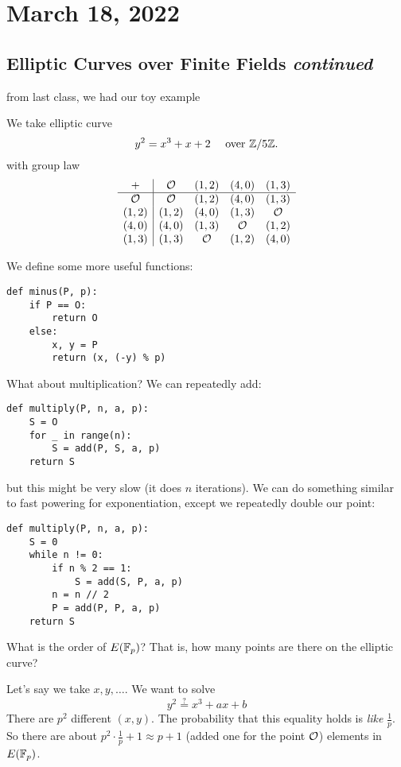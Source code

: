 \section{March 18, 2022}
\subsection{Elliptic Curves over Finite Fields \emph{continued}}
\recall from last class, we had our toy example
\begin{example*}
    We take elliptic curve
    \[y^2 = x^3 + x + 2\quad \text{ over }\mathbb Z/5\mathbb Z.\]
    with group law
    \[\begin{array}{c|cccc}
            +     & \mathcal{O}   & (1,2) & (4,0) & (1,3) \\ \hline
            \mathcal{O}   & \mathcal{O}   & (1,2) & (4,0) & (1,3) \\
            (1,2) & (1,2) & (4,0) & (1,3) & \mathcal{O}   \\
            (4,0) & (4,0) & (1,3) & \mathcal{O}   & (1,2) \\
            (1,3) & (1,3) & \mathcal{O}   & (1,2) & (4,0)
        \end{array}\]
\end{example*}
We define some more useful functions:
\begin{lstlisting}
def minus(P, p):
    if P == O:
        return O
    else:
        x, y = P
        return (x, (-y) % p)
\end{lstlisting}
What about multiplication? We can repeatedly add:
\begin{lstlisting}
def multiply(P, n, a, p):
    S = O
    for _ in range(n):
        S = add(P, S, a, p)
    return S
\end{lstlisting}
but this might be very slow (it does $n$ iterations). We can do something similar to fast powering for exponentiation, except we repeatedly double our point:
\begin{lstlisting}
def multiply(P, n, a, p):
    S = 0
    while n != 0:
        if n % 2 == 1:
            S = add(S, P, a, p)
        n = n // 2
        P = add(P, P, a, p)
    return S
\end{lstlisting}

\begin{ques*}
    What is the order of $E(\mathbb F_p)$? That is, how many points are there on the elliptic curve?
\end{ques*}
Let's say we take $x, y, \dots$. We want to solve
\[y^2\overset{?}{=}x^3 + ax + b\]
There are $p^2$ different $(x, y)$. The probability that this equality holds is \emph{like} $\frac{1}{p}$. So there are about $p^2\cdot \frac{1}{p} + 1\approx p + 1$ (added one for the point $\mathcal{O}$) elements in $E(\mathbb F_p)$.

